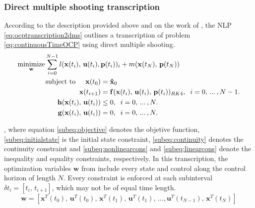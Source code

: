 \subsubsection*{Direct multiple shooting transcription}
\label{subsubsection:dmstranscription}

According to the description provided above and on the work of \citet{bock2007numerical}, the NLP \eqref{eq:ocptranscription2dms} outlines a transcription of problem \eqref{eq:continuousTimeOCP} using direct multiple shooting.
\begin{subequations}\label{eq:ocptranscription2dms}
	\begin{align}
		\underset{\mathbf{w}}{\text{minimize}} \sum_{i=0}^{N-1} l(\mathbf{x}(t_i),\,\mathbf{u}(t_i),\,&\mathbf{p}(t_i))_i + m(\mathbf{x}(t_N),\,\mathbf{p}(t_N)) \label{subeq:objective} \\
		\text{subject to} \hspace{5mm} \mathbf{x}(t_0) &=\mathbf{\hat{x}}_0 \label{subeq:initialstate} \\
		\mathbf{x}(t_{i+1}) &= \mathbf{f}(\mathbf{x}(t_i),\,\mathbf{u}(t_i),\,\mathbf{p}(t_i))_{RK4},\hspace{0.2cm} i= 0,\,...\,,N-1. \label{subeq:continuity} \\
		\mathbf{h}(\mathbf{x}(t_i),\,\mathbf{u}(t_i)) &\leq 0, \hspace{0.2cm} i= 0,\,...\,,N.  \label{subeq:nonlinearcons} \\
		\mathbf{g}(\mathbf{x}(t_i),\,\mathbf{u}(t_i)) &= 0, \hspace{0.2cm} i= 0,\,...\,,N. \label{subeq:linearcons}
	\end{align}
\end{subequations}

\noindent , where equation \eqref{subeq:objective} denotes the objetive function, \eqref{subeq:initialstate} is the initial state constraint, \eqref{subeq:continuity} denotes the continuity constraint and \eqref{subeq:nonlinearcons} and \eqref{subeq:linearcons} denote the inequality and equality constraints, respectively. In this transcription, the optimization variables $\mathbf{w}$ from  include every state and control along the control horizon of length $N$. Every constraint is enforced at each subinterval $\delta t_i = \left[t_i,\,t_{i+1}\right]$, which may not be of equal time length.
\begin{equation}
\mathbf{w} = \left[\mathbf{x}^T(t_0),\,\mathbf{u}^T(t_0),\,\mathbf{x}^T(t_1),\,\mathbf{u}^T(t_1),\,\ldots,\mathbf{u}^T(t_{N-1}),\,\mathbf{x}^T(t_N) \right]
\label{eq:optimizationVar}
\end{equation}

